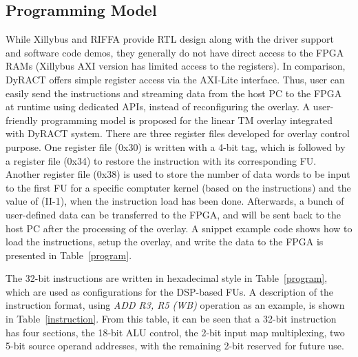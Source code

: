 \subsection{Programming Model}
While Xillybus and RIFFA provide RTL design along with the driver support and software code demos, they generally do not have direct access to the FPGA RAMs (Xillybus AXI version has limited access to the registers). 
In comparison, DyRACT offers simple register access via the AXI-Lite interface. 
Thus,  user can easily send the instructions and streaming data from the host PC to the FPGA at runtime using dedicated APIs, instead of reconfiguring the overlay. 
A user-friendly programming model is proposed for the linear TM overlay integrated with DyRACT system. 
There are three register files developed for overlay control purpose. 
One register file (0x30) is written with a 4-bit tag, which is followed by a register file (0x34) to restore the instruction with its corresponding FU. 
Another register file (0x38) is used to store the number of data words to be input to the first FU for a specific comptuter kernel (based on the instructions) and the value of (II-1), when the instruction load has been done. 
Afterwards, a bunch of user-defined data can be transferred to the FPGA, and will be sent back to the host PC after the processing of the overlay. 
A snippet example code shows how to load the instructions, setup the overlay, and write the data to the FPGA is presented in Table~\ref{program}. 



The 32-bit instructions are written in hexadecimal style in Table~\ref{program}, which are used as configurations for the DSP-based FUs. 
A description of the instruction format, using \textit{ADD R3, R5 (WB)} operation as an example, is shown in Table~\ref{instruction}. 
From this table, it can be seen that a 32-bit instruction has four sections, the 18-bit ALU control, the 2-bit input map multiplexing, two 5-bit source operand addresses, with the remaining 2-bit reserved for future use. 



